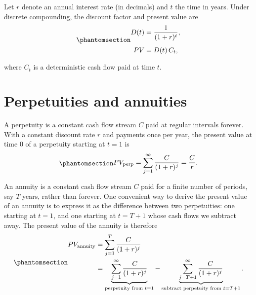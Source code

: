 \documentclass[
  letterpaper,
  DIV=11,
  numbers=noendperiod]{scrreprt}
\begin{document}
\begin{tcolorbox}[enhanced jigsaw, arc=.35mm, bottomrule=.15mm, bottomtitle=1mm, breakable, colback=white, colbacktitle=quarto-callout-note-color!10!white, colframe=quarto-callout-note-color-frame, coltitle=black, left=2mm, leftrule=.75mm, opacityback=0, opacitybacktitle=0.6, rightrule=.15mm, title=\textcolor{quarto-callout-note-color}{\faInfo}\hspace{0.5em}{Note}, titlerule=0mm, toprule=.15mm, toptitle=1mm]

Let \(r\) denote an annual interest rate (in decimals) and \(t\) the
time in years. Under discrete compounding, the discount factor and
present value are
\begin{equation}\protect\phantomsection\label{eq-discount-factor_discrete_and_pv}{
\begin{align}
    D(t) &= \frac{1}{(1 + r)^t},\\[1ex] 
    PV   &= D(t)\,C_t,
\end{align}
}\end{equation}

where \(C_t\) is a deterministic cash flow paid at time \(t\).

\end{tcolorbox}

\section*{Perpetuities and annuities}\label{perpetuities-and-annuities}


A perpetuity is a constant cash flow stream \(C\) paid at regular
intervals forever. With a constant discount rate \(r\) and payments once
per year, the present value at time \(0\) of a perpetuity starting at
\(t=1\) is \begin{equation}\protect\phantomsection\label{eq-perpetuity}{
\begin{align}
    PV_{\text{perp}} = \sum_{j=1}^{\infty} \frac{C}{(1 + r)^j} = \frac{C}{r}.
\end{align}
}\end{equation}

An annuity is a constant cash flow stream \(C\) paid for a finite number
of periods, say \(T\) years, rather than forever. One convenient way to
derive the present value of an annuity is to express it as the
difference between two perpetuities: one starting at \(t=1\), and one
starting at \(t = T+1\) whose cash flows we subtract away. The present
value of the annuity is therefore
\begin{equation}\protect\phantomsection\label{eq-annuity}{
\begin{align}
    PV_{\text{annuity}}
    &= \sum_{j=1}^{T} \frac{C}{(1 + r)^j} \\
    &= \underbrace{\sum_{j=1}^{\infty} \frac{C}{(1 + r)^j}}_{\text{perpetuity from } t=1}
        - \underbrace{\sum_{j=T+1}^{\infty} \frac{C}{(1 + r)^j}}_{\text{subtract perpetuity from } t=T+1}.
\end{align}
}\end{equation}
\end{document}
